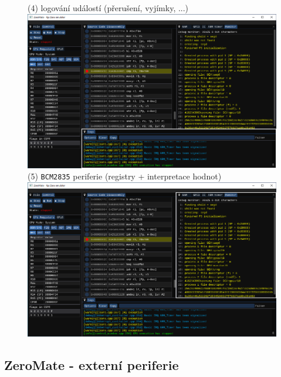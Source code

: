 \documentclass[compress]{beamer}
\begin{document}
\begin{frame}
\begin{overlayarea}{\textwidth}{\textheight}
\begin{figure}
{			}%
			\only<4>
			{%
				\normalsize \textcolor{UBCblue}{(4) logování událostí (přerušení, vyjímky, ...)}\\
				\vspace{0.1cm}
				\includegraphics[width=.85\textwidth]{img/gui/04.pdf}%
			}%
			\only<5>
			{%
				\normalsize \textcolor{UBCblue}{(5) \texttt{BCM2835} periferie (registry + interpretace hodnot)}\\
				\vspace{0.1cm}
				\includegraphics[width=.85\textwidth]{img/gui/05.pdf}%
			}%
		\end{figure}
	\end{overlayarea}      
\end{frame}

\subsection{ZeroMate - externí periferie}
\end{document}
